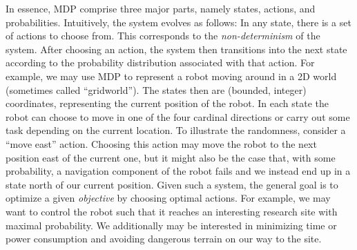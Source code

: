\documentclass{theoretics}
\begin{document}
In essence, MDP comprise three major parts, namely states, actions, and probabilities.
Intuitively, the system evolves as follows:
In any state, there is a set of actions to choose from.
This corresponds to the \emph{non-determinism} of the system.
After choosing an action, the system then transitions into the next state according to the probability distribution associated with that action.
For example, we may use MDP to represent a robot moving around in a 2D world (sometimes called \enquote{gridworld}).
The states then are (bounded, integer) coordinates, representing the current position of the robot.
In each state the robot can choose to move in one of the four cardinal directions or carry out some task depending on the current location.
To illustrate the randomness, consider a \enquote{move east} action.
Choosing this action may move the robot to the next position east of the current one, but it might also be the case that, with some probability, a navigation component of the robot fails and we instead end up in a state north of our current position.
Given such a system, the general goal is to optimize a given \emph{objective} by choosing optimal actions.
For example, we may want to control the robot such that it reaches an interesting research site with maximal probability.
We additionally may be interested in minimizing time or power consumption and avoiding dangerous terrain on our way to the site.
\end{document}
